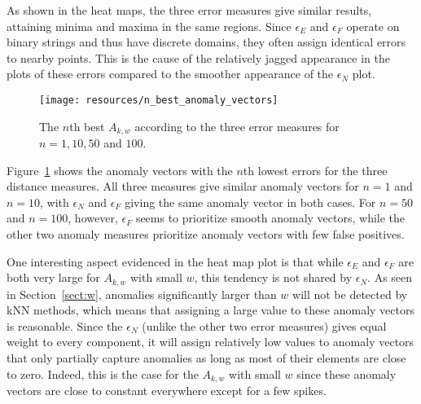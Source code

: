 As shown in the heat maps, the three error measures give similar results, attaining minima and maxima in the same regions. Since $\epsilon_E$ and $\epsilon_F$ operate on binary strings and thus have discrete domains, they often assign identical errors to nearby points. This is the cause of the relatively jagged appearance in the plots of these errors compared to the smoother appearance of the $\epsilon_N$ plot.

\begin{figure}[ht]
    \begin{center}
        \texttt{[image: resources/n\_best\_anomaly\_vectors]}
    \end{center}
    \caption{\small{The $n$th best $A_{k, w}$ according to the three error measures for $n = 1, 10, 50$ and $100$.}}
\label{fig:n_best_anomaly_vectors}
\end{figure}

Figure~\ref{fig:n_best_anomaly_vectors} shows the anomaly vectors with the $n$th lowest errors for the three distance measures. All three measures give similar anomaly vectors for $n = 1$ and $n = 10$, with $\epsilon_N$ and $\epsilon_F$ giving the same anomaly vector in both cases. For $n = 50$ and $n = 100$, however, $\epsilon_F$ seems to prioritize smooth anomaly vectors, while the other two anomaly measures prioritize anomaly vectors with few false positives.

One interesting aspect evidenced in the heat map plot is that while $\epsilon_E$ and $\epsilon_F$ are both very large for $A_{k,w}$ with small $w$, this tendency is not shared by $\epsilon_N$. As seen in Section~\ref{sect:w}, anomalies significantly larger than $w$ will not be detected by kNN methods, which means that assigning a large value to these anomaly vectors is reasonable. Since the $\epsilon_N$ (unlike the other two error measures) gives equal weight to every component, it will assign relatively low values to anomaly vectors that only partially capture anomalies as long as most of their elements are close to zero.  Indeed, this is the case for the $A_{k,w}$ with small $w$ since these anomaly vectors are close to constant everywhere except for a few spikes.

